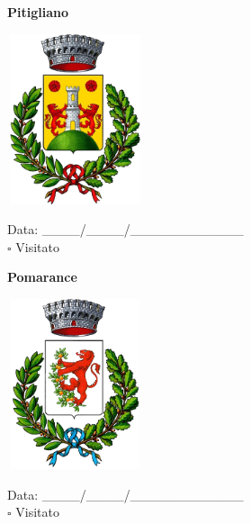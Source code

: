 \documentclass[a5paper,12pt]{article}
\begin{document}
\newpage

\noindent
\begin{minipage}[t]{0.45\textwidth}
    \begin{center}
        \textbf{Pitigliano}
    \end{center}
    \vspace{-0.5cm} %
    \begin{center}
        \includegraphics[height= 5cm, width=4cm]{Toscana/Stemma Pitigliano.png}
    \end{center}
    \vspace{-0.4cm} %
    \begin{flushleft}
        Data: \_\_\_\_/\_\_\_\_/\_\_\_\_\_\_\_\_\_\_\_\_ \\
        $\square$ Visitato
    \end{flushleft}
\end{minipage}
\hfill
\noindent
\begin{minipage}[t]{0.45\textwidth}
    \begin{center}
        \textbf{Pomarance}
    \end{center}
    \vspace{-0.5cm} %
    \begin{center}
        \includegraphics[height= 5cm, width=4cm]{Toscana/Stemma Pomarance.png}
    \end{center}
    \vspace{-0.4cm} %
    \begin{flushleft}
        Data: \_\_\_\_/\_\_\_\_/\_\_\_\_\_\_\_\_\_\_\_\_ \\
        $\square$ Visitato
    \end{flushleft}
\end{minipage}
\end{document}

